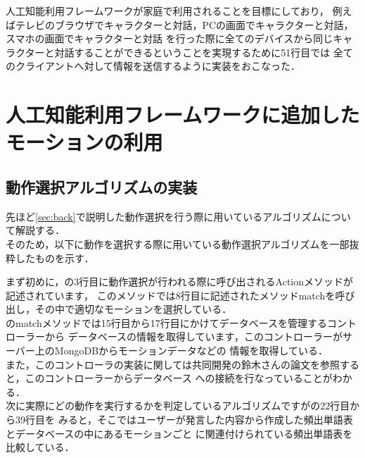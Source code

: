 人工知能利用フレームワークが家庭で利用されることを目標にしており，
例えばテレビのブラウザでキャラクターと対話，PCの画面でキャラクターと対話，スマホの画面でキャラクターと対話
を行った際に全てのデバイスから同じキャラクターと対話することができるということを実現するために51行目では
全てのクライアントへ対して情報を送信するように実装をおこなった．\\


\section{人工知能利用フレームワークに追加したモーションの利用}\label{sec:motion}
\subsection{動作選択アルゴリズムの実装}
先ほど\ref{sec:back}で説明した動作選択を行う際に用いているアルゴリズムについて解説する．\\

そのため，以下に動作を選択する際に用いている動作選択アルゴリズムを一部抜粋したものを示す．


まず初めに，の3行目に動作選択が行われる際に呼び出されるActionメソッドが記述されています，
このメソッドでは8行目に記述されたメソッドmatchを呼び出し，その中で適切なモーションを選択している．\\

のmatchメソッドでは15行目から17行目にかけてデータベースを管理するコントローラーから
データベースの情報を取得しています，このコントローラーがサーバー上のMongoDBからモーションデータなどの
情報を取得している．
\\
また，このコントローラの実装に関しては共同開発の鈴木さんの論文\cite{suzuki}を参照すると，このコントローラーからデータベース
への接続を行なっていることがわかる．
\\

次に実際にどの動作を実行するかを判定しているアルゴリズムですがの22行目から39行目を
みると，そこではユーザーが発言した内容から作成した頻出単語表とデータベースの中にあるモーションごと
に関連付けられている頻出単語表を比較している．\\

